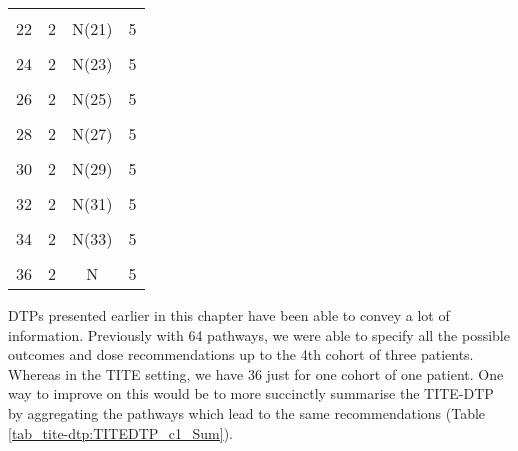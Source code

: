 \begin{table}[H]
{\begin{tabular}[t]{cccc}
			\cellcolor{gray!6}{21} & \cellcolor{gray!6}{2} & \cellcolor{gray!6}{N(20)} & \cellcolor{gray!6}{5}\\
			22 & 2 & N(21) & 5\\
			\cellcolor{gray!6}{23} & \cellcolor{gray!6}{2} & \cellcolor{gray!6}{N(22)} & \cellcolor{gray!6}{5}\\
			24 & 2 & N(23) & 5\\
			\cellcolor{gray!6}{25} & \cellcolor{gray!6}{2} & \cellcolor{gray!6}{N(24)} & \cellcolor{gray!6}{5}\\
			26 & 2 & N(25) & 5\\
			\cellcolor{gray!6}{27} & \cellcolor{gray!6}{2} & \cellcolor{gray!6}{N(26)} & \cellcolor{gray!6}{5}\\
			28 & 2 & N(27) & 5\\
			\cellcolor{gray!6}{29} & \cellcolor{gray!6}{2} & \cellcolor{gray!6}{N(28)} & \cellcolor{gray!6}{5}\\
			30 & 2 & N(29) & 5\\
			\cellcolor{gray!6}{31} & \cellcolor{gray!6}{2} & \cellcolor{gray!6}{N(30)} & \cellcolor{gray!6}{5}\\
			32 & 2 & N(31) & 5\\
			\cellcolor{gray!6}{33} & \cellcolor{gray!6}{2} & \cellcolor{gray!6}{N(32)} & \cellcolor{gray!6}{5}\\
			34 & 2 & N(33) & 5\\
			\cellcolor{gray!6}{35} & \cellcolor{gray!6}{2} & \cellcolor{gray!6}{N(34)} & \cellcolor{gray!6}{5}\\
			36 & 2 & N & 5\\
			\bottomrule
	\end{tabular}}
\end{table}

DTPs presented earlier in this chapter have been able to convey a lot of information. Previously with 64 pathways, we were able to specify all the possible outcomes and dose recommendations up to the 4th cohort of three patients. Whereas in the TITE setting, we have 36 just for one cohort of one patient. One way to improve on this would be to more succinctly summarise the TITE-DTP by aggregating the pathways which lead to the same recommendations (Table \ref{tab_tite-dtp:TITEDTP_c1_Sum}). 

